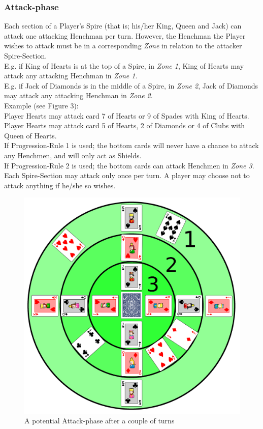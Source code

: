 \documentclass[11pt]{article} %
\begin{document}
\subsubsection{Attack-phase}
Each section of a Player's Spire (that is; his/her King, Queen and Jack) can attack one attacking Henchman per turn. However, the Henchman the Player wishes to attack must be in a corresponding \textit{Zone} in relation to the attacker Spire-Section. \\
E.g. if King of Hearts is at the top of a Spire, in \textit{Zone 1}, King of Hearts may attack any attacking Henchman in \textit{Zone 1}. \\
E.g. if Jack of Diamonds is in the middle of a Spire, in \textit{Zone 2}, Jack of Diamonds may attack any attacking Henchman in \textit{Zone 2}.\\

\noindent
Example (see Figure 3): \\
Player Hearts may attack card 7 of Hearts or 9 of Spades with King of Hearts. \\
Player Hearts may attack card 5 of Hearts, 2 of Diamonds or 4 of Clubs with Queen of Hearts. \\
If Progression-Rule 1 is used; the bottom cards will never have a chance to attack any Henchmen, and will only act as Shields. \\
If Progression-Rule 2 is used; the bottom cards can attack Henchmen in \textit{Zone 3}. \\

\noindent
Each Spire-Section may attack only once per turn. A player may choose not to attack anything if he/she so wishes.

\begin{figure}[h!]
\centering
\includegraphics[scale=0.08]{attack.png}
\caption{A potential Attack-phase after a couple of turns}
\label{starting}
\end{figure}
\end{document}
